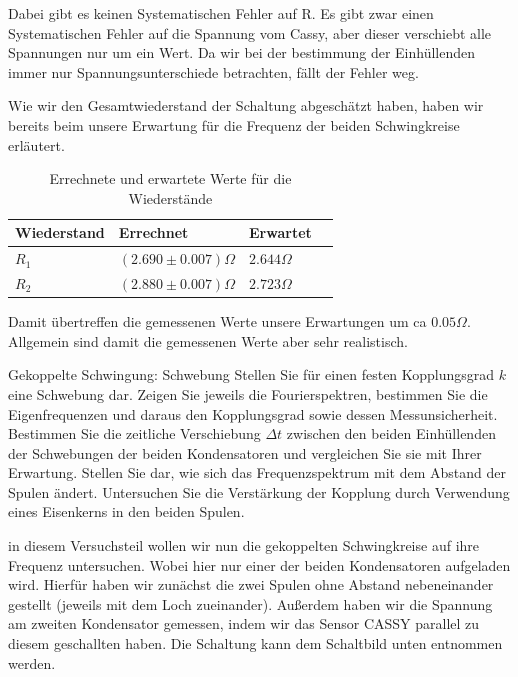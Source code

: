 \documentclass[twoside]{protokoll}
\begin{document}
Dabei gibt es keinen Systematischen Fehler auf R. Es gibt zwar einen Systematischen Fehler auf die Spannung vom Cassy, aber dieser verschiebt alle Spannungen nur um ein Wert.
Da wir bei der bestimmung der Einhüllenden immer nur Spannungsunterschiede betrachten, fällt der Fehler weg.
 
 
Wie wir den Gesamtwiederstand der Schaltung abgeschätzt haben, haben wir bereits beim unsere Erwartung für die Frequenz der beiden Schwingkreise erläutert.
\begin{table}[H]
    \centering
    \begin{tabularx}{1\textwidth}{X X X X} %
        \toprule
        \textbf{Wiederstand} & \textbf{Errechnet} & \textbf{Erwartet} \\
        \midrule
        $R_1$ & $(2.690 \pm 0.007) \Omega$ & $2.644 \Omega$ \\
        $R_2$ & $(2.880 \pm 0.007) \Omega$ & $2.723 \Omega$ \\
        \bottomrule
    \end{tabularx}
    \caption{Errechnete und erwartete Werte für die Wiederstände}
\end{table}
Damit übertreffen die gemessenen Werte unsere Erwartungen um ca $0.05 \Omega$.
Allgemein sind damit die gemessenen Werte aber sehr realistisch.
 
 
\begin{aufgabe}{Gekoppelte Schwingung: Schwebung}
  Stellen Sie für einen festen Kopplungsgrad $k$ eine Schwebung
  dar. Zeigen Sie jeweils die Fourierspektren, bestimmen Sie die
  Eigenfrequenzen und daraus den Kopplungsgrad sowie dessen
  Messunsicherheit. Bestimmen Sie die zeitliche Verschiebung
  $\Delta{}t$ zwischen den beiden Einhüllenden der Schwebungen der
  beiden Kondensatoren und vergleichen Sie sie mit Ihrer
  Erwartung. Stellen Sie dar, wie sich das Frequenzspektrum mit dem
  Abstand der Spulen ändert. Untersuchen Sie die Verstärkung der
  Kopplung durch Verwendung eines Eisenkerns in den beiden Spulen.
\end{aufgabe}

in diesem Versuchsteil wollen wir nun die gekoppelten Schwingkreise auf ihre Frequenz untersuchen. Wobei hier nur einer der beiden Kondensatoren aufgeladen wird.
Hierfür haben wir zunächst die zwei Spulen ohne Abstand nebeneinander gestellt (jeweils mit dem Loch zueinander). 
Außerdem haben wir die Spannung am zweiten Kondensator gemessen, indem wir das Sensor CASSY parallel zu diesem geschallten haben. 
Die Schaltung kann dem Schaltbild unten entnommen werden. \\
\end{document}
